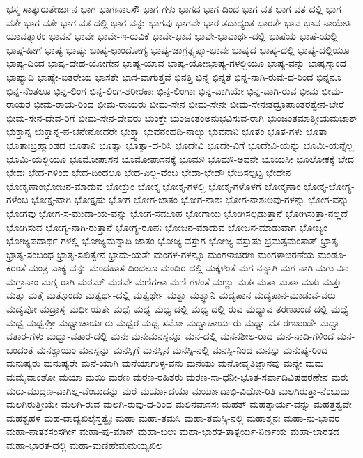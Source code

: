 {ಭಸ್ಮ-ಸಾತ್ಕುರುತೇರ್ಜುನ
ಭಾಗ
ಭಾಗಃನಾಽಸೌ
ಭಾಗ-ಗಳು
ಭಾಗದ
ಭಾಗ-ದಿಂದ
ಭಾಗ-ವತ
ಭಾಗ-ವತ-ದಲ್ಲಿ
ಭಾಗ-ವತೇ
ಭಾಗ-ವತೇ-ಭಾಗ-ವತ-ದಲ್ಲಿ
ಭಾಗ-ವನ್ನು
ಭಾಗವು
ಭಾಗವೇ
ಭಾರ-ತದಾದ್ಯಂತ
ಭಾರತೇ
ಭಾವ
ಭಾವ-ನಾಯೇತಿ-ಯಾವತ್ನಾರಂ
ಭಾವನೆ
ಭಾವೇ
ಭಾವೇ-ಇ-ರುವಿಕೆ
ಭಾವೇ-ಭಾವ
ಭಾವೇ-ಭಾವಾರ್ಥ-ದಲ್ಲಿ
ಭಾಷೆಯ
ಭಾಷೆ-ಯಲ್ಲಿ
ಭಾಷ್ಠೆ-ಹೀಗೆ
ಭಾಷ್ಯ
ಭಾಷ್ಯಃ
ಭಾಷ್ಯ-ಛಾಂದೋಗ್ಯ
ಭಾಷ್ಯ-ಜಾಗ್ರತ್ಸ್ವಪ್ನಾ-ಭಾವಃ
ಭಾಷ್ಯದ
ಭಾಷ್ಯ-ದಲ್ಲಿ
ಭಾಷ್ಯ-ದಲ್ಲಿಯೂ
ಭಾಷ್ಯ-ದಿಂದ
ಭಾಷ್ಯ-ದೇಹ-ಯೋಗೇನ
ಭಾಷ್ಯ-ಯಾವ
ಭಾಷ್ಯ-ಯೋಃಭಾಷ್ಯ-ಗಳಲ್ಲಿಯೂ
ಭಾಷ್ಯ-ವನ್ನು
ಭಾಷ್ಯಸ್ಕಾಂದ
ಭಾಷ್ಯಾದಿ
ಭಾಷ್ಯೇ-ಐತರೇಯ
ಭಾಸತೇ
ಭಾಸ-ವಾಗುತ್ತವೆ
ಭಿನತ್ತಿ
ಭಿನ್ನ
ಭಿನ್ನತೆ
ಭಿನ್ನ-ನಾಗಿ-ರುವು-ದ-ರಿಂದ
ಭಿನ್ನನೂ
ಭಿನ್ನ-ನೆಂತಲೂ
ಭಿನ್ನ-ಲಿಂಗ
ಭಿನ್ನ-ಲಿಂಗ-ಶರೀರಕಾಃ
ಭಿನ್ನ-ಲಿಂಗಾಃ
ಭಿನ್ನ-ವಾಗಿಯೇ
ಭಿನ್ನ-ವಾಗಿ-ರುವ
ಭೀಮ
ಭೀಮ-ರಾಯರ
ಭೀಮ-ರಾಯ-ರಿಂದ
ಭೀಮ-ರಾಯರು
ಭೀಮ-ಸೇನ
ಭೀಮ-ಸೇನಃ
ಭೀಮ-ಸೇನಃತದ್ರೂಪಾಂತರತ್ವೇನ-ಬೇರೆ
ಭೀಮ-ಸೇನ-ದೇವ-ರಿಗೆ
ಭೀಮ-ಸೇನ-ದೇವರು
ಭುಂಕ್ತೇ
ಭುಂಜಂತಂಅನುಭವಿಸುವ-ರಾಗಿ
ಭುಂಜಂತಮಾತ್ಮೀಯಮಜಾತ್
ಭುಕ್ತಾನ್ನ
ಭುಕ್ತಾನ್ನ-ಪ-ಚನೇನೋದರೇ
ಭುಕ್ತ್ವಾ
ಭುವನಂಹದಿ-ನಾಲ್ಕು
ಭುವನಾನಿ
ಭೂತಂ
ಭೂತ-ಗಳು
ಭೂತಾ
ಭೂತಾಃಬ್ರಹ್ಮಾಂಡದ
ಭೂತಾನಿ
ಭೂತ್ವಾ
ಭೂತ್ವಾ-ಧ-ರಿಸಿ
ಭೂದೇವಿ
ಭೂದೇ-ವಿಗೆ
ಭೂದೇವಿ-ಯನ್ನು
ಭೂಮಿ-ಯನ್ನೆಲ್ಲ
ಭೂಮಿ-ಯಲ್ಲಿಯೂ
ಭೂಮೋಪಾಸನ
ಭೂಮೋಪಾಸನಕ್ಕೆ
ಭೂಮೌ
ಭೂಮೌ-ಅವನೇ
ಭೂಯಸೀ
ಭೂಲೋಕಕ್ಕೆ
ಭೇದ
ಭೇದಃ
ಭೇದ-ಗಳಿಂದ
ಭೇದ-ದಿಂದಲೂ
ಭೇದ-ವಿಲ್ಲ-ವೆಂಬ
ಭೇದಾ-ಭೇದೌ
ಭೇದಿಸಲ್ಪಟ್ಟ
ಭೇದೇನ
ಭೋಕೃಣಾಂಭೋಜನ-ಮಾಡುವ
ಭೋಕ್ತುಂ
ಭೋಕ್ತೃ
ಭೋಕ್ತೃ-ಗಳಲ್ಲಿ
ಭೋಕ್ತೃ-ಗಳೊಳಗೆ
ಭೋಕ್ತೃಣಾಂ
ಭೋಕ್ತೃ-ಭೋಗ್ಯ-ಗಳೆಂಬ
ಭೋಕ್ತೃ-ವಾಗಿ
ಭೋಕ್ತೃಷು
ಭೋಗ
ಭೋಗ-ಜಾತಂ
ಭೋಗ-ನಾಶಃ
ಭೋಗ-ನಾಶಃಅವು-ಗಳನ್ನು
ಭೋಗ-ವನ್ನು
ಭೋಗವು
ಭೋಗ-ಸ-ಮುದಾ-ಯ-ವನ್ನು
ಭೋಗ-ಸಮೂಹ
ಭೋಗಾಯ
ಭೋಗಿಸಲ್ಪಡುತ್ತಾನೆ
ಭೋಗಿಸುತ್ತಾ-ನಲ್ಲದೆ
ಭೋಗಿಸುವ
ಭೋಗ್ಯ-ನಾಗಿ-ರುತ್ತಾನೆ
ಭೋಗ್ಯ-ರೂಪಃ
ಭೋಜನ-ಮಾಡುವ
ಭೋಜನ-ಮಾಡುವಾಗ
ಭೋಜ್ಯಂ
ಭೋಜ್ಯಪದಾರ್ಥ-ಗಳಲ್ಲಿ
ಭೋಜ್ಯಮನ್ನಾದಿ-ಜಾತಂ
ಭೋಜ್ಯ-ವಸ್ತುಗ
ಭೋಜ್ಯ-ವಸ್ತುಷು
ಭ್ರಮತ್ಸಮಂತಾತ್
ಭ್ರಾತೃ
ಭ್ರಾತೃ-ಸಂಬಂಧ
ಭ್ರಾತೃ-ಸಖಿತ್ವೇನ
ಭ್ರಾಮ-ಯತೇ
ಮಂಗಳ-ಗಳನ್ನೂ
ಮಂಗಳಾಚರಣ
ಮಂಗಳಾಚರಣೆಯ
ಮಂಡೂ-ಕರಂತೆ
ಮಂತ್ರ-ವಾಕ್ಯ-ವನ್ನು
ಮಂದಹಾಸ-ದಿಂದಲೂ
ಮಂದಿರ-ದಲ್ಲಿ
ಮಕ್ಕಳಂತೆ
ಮಗ-ನನ್ನಾಗಿ
ಮಗ-ನಾಗಿ
ಮಗು-ವಿನ
ಮಗ್ತಾನಾಂ
ಮಗ್ನ-ರಾಗಿ
ಮಠಮ್
ಮಠವೇ
ಮಣಿಗಣಾ
ಮಣಿ-ಗಳಂತೆ
ಮಣ್ಣು
ಮತಃ
ಮತಾ
ಮತಾಃ
ಮತು
ಮತ್ತಃ
ಮತ್ತು
ಮತ್ತೆ
ಮತ್ತೊಂದು
ಮತ್ವರ್ಥ-ದಲ್ಲಿ
ಮತ್ವರ್ಥೇ
ಮತ್ವಾ
ಮತ್ಸ್ಥಾನಿ
ಮದ್ಯಪಾನ
ಮದ್ಯಪಾನ-ಮಾಡುವ-ವರು
ಮದ್ಯಪೋ
ಮದ್ರಾಸ್ನ
ಮಧೀ-ಯತೇ
ಮಧೈ
ಮಧ್ಯ
ಮಧ್ಯ-ದಲ್ಲಿ
ಮಧ್ಯ-ದಲ್ಲಿ-ರುವ
ಮಧ್ಯಾವ-ತರಣಖಂಡ-ದಲ್ಲಿ
ಮಧ್ಯೆ
ಮಧ್ವ
ಮಧ್ವಃಶ್ರೀ-ಮಧ್ವಾಚಾರ್ಯರು
ಮಧ್ವರ
ಮಧ್ವ-ಸಮೋ
ಮಧ್ವಾಚಾರ್ಯರು
ಮಧ್ವಾ-ವತ-ರಣಖಂಡೇ
ಮಧ್ವಾ-ವತಾರ-ಗಳು
ಮಧ್ವಾ-ವತಾರ-ದಲ್ಲಿ
ಮನಃ
ಮನಃಮನಸ್ಸನ್ನೂ
ಮನ-ದಲ್ಲಿ
ಮನನಶೀಲ-ರಾದ
ಮನ-ನಾದಿ-ಗಳಿಂದ
ಮನ-ಬಂದಂತೆ
ಮನಶ್ಚಾಯಂ
ಮನಸ್ಸನ್ನು
ಮನಸ್ಸಿಗೆ
ಮನಸ್ಸಿನ
ಮನಸ್ಸಿ-ನಲ್ಲಿ
ಮನಸ್ಸಿ-ನಿಂದ
ಮನಸ್ಸು
ಮನುಷ್ಯ-ರಿಂದ
ಮನುಷ್ಯರು
ಮನುಷ್ಯರೇ
ಮನೆ-ಯಾಗಿ
ಮನೆಯಾಗುಳ್ಳ-ವನು
ಮನೆಯು
ಮನೋವೃತಿಜ್ಞಾನವು
ಮನ್ಯೇ
ಮಮ
ಮಮೈವಾಂಶೋ
ಮಯಾ
ಮಯಿ
ಮರಣ
ಮರಣ-ರಹಿತರು
ಮರಣ-ಸಾ-ಧನೀ-ಭೂತ-ಸರ್ಪಾದಿವಿಷಹರಣೇನ
ಮರು
ಮರು-ಮುದ್ರಣ-ವಾಗಿಲ್ಲ-ವೆಂಬುದನ್ನು
ಮರೆ
ಮರ್ಯಾದಯಾ
ಮರ್ಯಾದಾಭಿ-ವಿಧೋ-ರಿತಿ
ಮಲಗಿರುತ್ತಾ-ನೆಂಬುದು
ಮಲಗಿರುತ್ತೀಯೇ
ಮಲಗಿ-ರುವ
ಮಲಗಿ-ರುವು-ದ-ರಿಂದ
ಮಲಿನವಾಸಸಃ
ಮಹತ್
ಮಹತ್ಕಾರ್ಯ-ವನ್ನು
ಮಹತ್ತತ್ವವೇ
ಮಹತ್ಬಹಳ
ಮಹ-ದಾದ್ಯಖಿಲೈಸ್ತತ್ವೈಃ
ಮಹಾ
ಮಹಾ-ತಮಸಿ
ಮಹಾ-ತಮಸ್ಸಿ-ನಲ್ಲಿ
ಮಹಾತ್ಮನಃ
ಮಹಾ-ನು-ಭಾವರ
ಮಹಾ-ಪಾತಕಸಂಸರ್ಗೀ
ಮಹಾ-ಪು-ಮಾನ್
ಮಹಾ-ಬಲಃ
ಮಹಾ-ಭಾರತ-ತಾತ್ಪರ್ಯ-ನಿರ್ಣಯ
ಮಹಾ-ಭಾರತದ
ಮಹಾ-ಭಾರತ-ದಲ್ಲಿ
ಮಹಾ-ಮಣಿಹೇಮಮಯ್ಯಖಿಲ
}
